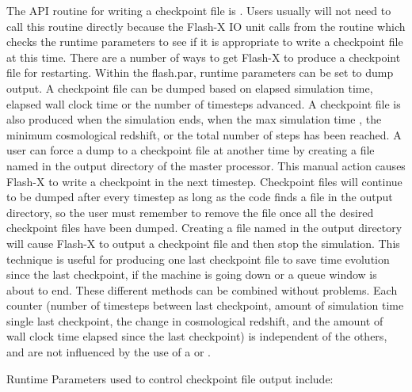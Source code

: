 The API routine for writing a checkpoint file is
.  Users usually will not need to call this
routine directly because the Flash-X IO unit calls
 from the routine  which
checks the runtime parameters to see if it is appropriate to write a
checkpoint file at this time.  
There are a number of ways to get Flash-X to
produce a checkpoint file for restarting. 
Within the flash.par, runtime parameters can be set to dump output.
A checkpoint file can be
dumped based on elapsed simulation time, elapsed wall clock time or
the number of timesteps advanced.  A checkpoint file is also
produced when the simulation ends, when the max simulation
time , the minimum cosmological redshift, or the total 
number of steps  has been reached.  A user can force a 
dump to a checkpoint file at another time
by creating a file named  in the output
directory of the master processor. This manual action causes Flash-X to write a
checkpoint in the next timestep.  Checkpoint files will continue to
be dumped after every timestep as long as the code finds a
file in the output directory, so the user must remember to remove the
file once all the desired checkpoint files have been dumped.
Creating a file named
 in the output directory will cause Flash-X to
output a checkpoint file and then stop the simulation.  This technique is
useful for producing one last checkpoint file to save time evolution
since the last checkpoint, if the machine is going
down or a queue window is about to end.
These different methods can be combined without problems.  Each
counter (number of timesteps between last checkpoint, amount of
simulation time single last checkpoint, the change in cosmological redshift,
and the amount of wall clock time elapsed since the last checkpoint) 
is independent of the others, and are not influenced by the use of a 
 or .


Runtime Parameters used to control checkpoint file output include:



